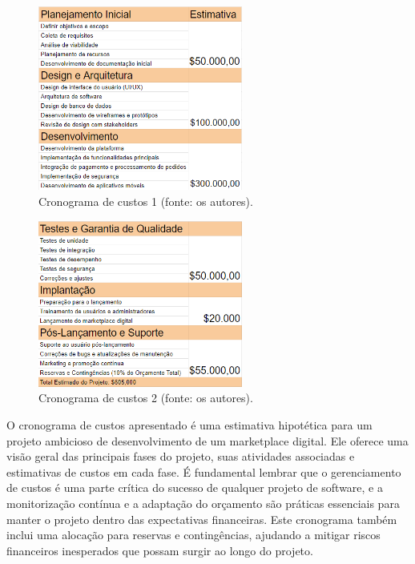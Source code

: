 \documentclass[
	12pt,				%
	openright,			%
	twoside,			%
	a4paper,			%
	english,			%
	brazil				%
	]{abntex2}
\begin{document}
\begin{figure}[htb]
	\centering
	\includegraphics[width=0.6\textwidth]{img/croncustos1}
	\caption{Cronograma de custos 1 (fonte: os autores).}
	\label{fig:croncustos1}
\end{figure}

\begin{figure}[htb]
	\centering
	\includegraphics[width=0.6\textwidth]{img/croncustos2}
	\caption{Cronograma de custos 2 (fonte: os autores).}
	\label{fig:croncustos2}
\end{figure}


O cronograma de custos apresentado é uma estimativa hipotética para um projeto ambicioso de desenvolvimento de um marketplace digital. Ele oferece uma visão geral das principais fases do projeto, suas atividades associadas e estimativas de custos em cada fase. É fundamental lembrar que o gerenciamento de custos é uma parte crítica do sucesso de qualquer projeto de software, e a monitorização contínua e a adaptação do orçamento são práticas essenciais para manter o projeto dentro das expectativas financeiras. Este cronograma também inclui uma alocação para reservas e contingências, ajudando a mitigar riscos financeiros inesperados que possam surgir ao longo do projeto.
\end{document}
